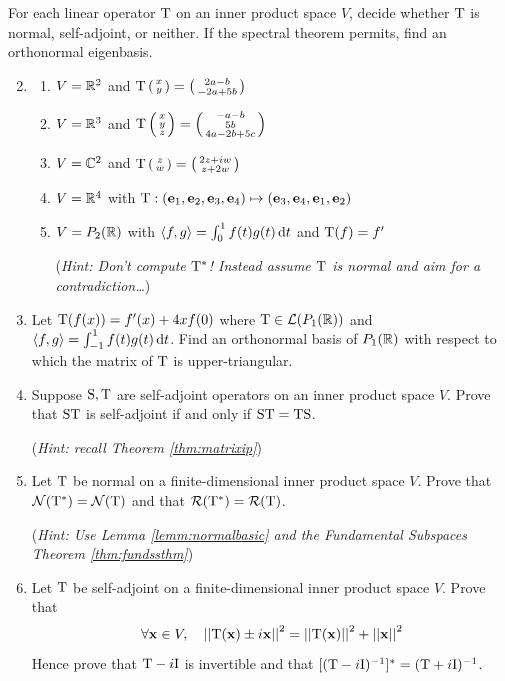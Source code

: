 \begin{exercises}
	\exstart For each linear operator $\mathrm{T}$ on an inner product space $V$, decide whether $\mathrm{T}$ is normal, self-adjoint, or neither. If the spectral theorem permits, find an orthonormal eigenbasis.
	\begin{enumerate}\setcounter{enumi}{1}
	  \item[]\begin{enumerate}
	    \item $V=\mathbb{R}^2$ and $\mathrm{T}\left(\begin{smallmatrix}x\\y\end{smallmatrix}\right)=\left(\begin{smallmatrix}2a-b\\-2a+5b\end{smallmatrix}\right)$
	    \item $V=\mathbb{R}^3$ and $\mathrm{T}\left(\begin{smallmatrix}x\\y\\z\end{smallmatrix}\right)=\left(\begin{smallmatrix}-a-b\\5b\\4a-2b+5c\end{smallmatrix}\right)$
	    \item $V=\mathbb{C}^2$ and $\mathrm{T}\left(\begin{smallmatrix}z\\w\end{smallmatrix}\right)=\left(\begin{smallmatrix}2z+iw\\z+2w\end{smallmatrix}\right)$
	    \item $V=\mathbb{R}^4$ with $\mathrm{T}:({\mathbf{e}}_1,{\mathbf{e}}_2,{\mathbf{e}}_3,{\mathbf{e}}_4)\mapsto ({\mathbf{e}}_3,{\mathbf{e}}_4,{\mathbf{e}}_1,{\mathbf{e}}_2)$
	    \item $V=P_2(\mathbb{R})$ with $\left\langle f,g\right\rangle=\int_0^1f(t)g(t)\,{\mathrm{d} t}$ and $\mathrm{T}(f)=f'$\par
	    (\emph{Hint: Don't compute $\mathrm{T}^*$! Instead assume $\mathrm{T}$ is normal and aim for a contradiction\ldots})
	  \end{enumerate}
	  
	  
	  \item Let $\mathrm{T}(f(x))=f'(x)+4xf(0)$ where $\mathrm{T}\in\mathcal{L}(P_1(\mathbb{R}))$ and $\left\langle f,g\right\rangle=\int_{-1}^1f(t)g(t)\,{\mathrm{d} t}$. Find an orthonormal basis of $P_1(\mathbb{R})$ with respect to which the matrix of $\mathrm{T}$ is upper-triangular.
	  
	  
	  \item Suppose $\mathrm{S},\mathrm{T}$ are self-adjoint operators on an inner product space $V$. Prove that $\mathrm{S}\mathrm{T}$ is self-adjoint if and only if $\mathrm{S}\mathrm{T}=\mathrm{T}\mathrm{S}$.\par
	  (\emph{Hint: recall Theorem \ref{thm:matrixip}})
	  	  
	  
	  \item Let $\mathrm{T}$ be normal on a finite-dimensional inner product space $V$. Prove that $\mathcal{N}(\mathrm{T}^*)=\mathcal{N}(\mathrm{T})$ and that $\mathcal{R}(\mathrm{T}^*)=\mathcal{R}(\mathrm{T})$.\par
	  (\emph{Hint: Use Lemma \ref{lemm:normalbasic} and the Fundamental Subspaces Theorem \ref{thm:fundssthm}})
	  
	  
	  \item Let $\mathrm{T}$ be self-adjoint on a finite-dimensional inner product space $V$. Prove that
	  \[
	  	\forall{\mathbf{x}}\in V,\quad 
	  	\left| \left| \mathrm{T}({\mathbf{x}})\pm i{\mathbf{x}}\right|\right|^2=\left| \left| \mathrm{T}({\mathbf{x}})\right|\right|^2+\left| \left| {\mathbf{x}}\right|\right|^2
	  \]
	  Hence prove that $\mathrm{T}-i\mathrm{I}$ is invertible and that $[(\mathrm{T}-i\mathrm{I})^{-1}]^*=(\mathrm{T}+i\mathrm{I})^{-1}$.
	  

\end{enumerate}
\end{exercises}
